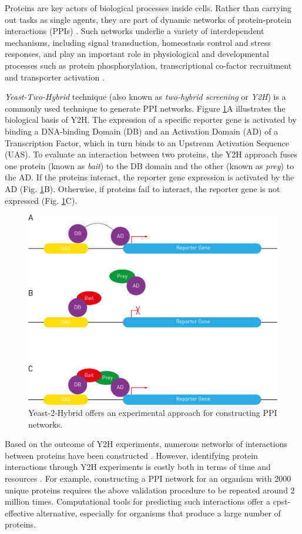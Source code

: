 Proteins are key actors of biological processes inside cells. Rather
than carrying out tasks as single agents, they are part of dynamic
networks of protein-protein interactions (PPIs) \cite{Lin2017}. Such
networks underlie a variety of interdependent mechanisms, including
signal transduction, homeostasis control and stress responses, and 
play an important role in physiological and developmental
processes such as protein phosphorylation, transcriptional co-factor
recruitment and transporter activation \cite{Zhang2010PPI}.

\emph{Yeast-Two-Hybrid} technique (also known as 
\emph{two-hybrid screening} or \emph{Y2H}) is a commonly used 
technique to generate PPI networks. Figure \ref{Y2H}A
illustrates the biological basis of Y2H. The expression of a specific
reporter gene is activated by binding a DNA-binding Domain
(DB) and an Activation Domain (AD) of a Transcription Factor, which
in turn binds to an Upstream Activation Sequence (UAS). To evaluate
an interaction between two proteins, the Y2H approach fuses one protein
(known as \emph{bait}) to the DB domain and the other (known as 
\emph{prey}) to the AD. If the proteins interact, the reporter
gene expression is activated by the AD (Fig. \ref{Y2H}B). Otherwise,
if proteins fail to interact, the reporter gene is not expressed (Fig.
\ref{Y2H}C).

\begin{figure}[h]
\caption{\label{Y2H}Yeast-2-Hybrid offers an experimental approach
for constructing PPI networks.}
\centering
	\includegraphics[width=0.7\columnwidth]{../Y2H}
\end{figure}

Based on the outcome of Y2H experiments, numerous networks
of interactions between proteins have been constructed \cite{Weimann2013Y2H,Rajagopala2015Y2H,Shokri2019TFY2H}.
However, identifying protein interactions through Y2H experiments is 
costly both in terms of time
and resources \cite{Laraia2015PPI,Macalino2018PPI}. For example, 
constructing a PPI network for an organism with 2000 unique 
proteins requires the above validation procedure to be repeated 
around 2 million times. Computational tools for predicting such 
interactions offer a cpst-effective alternative, especially for 
organisms that produce a large number of proteins.

